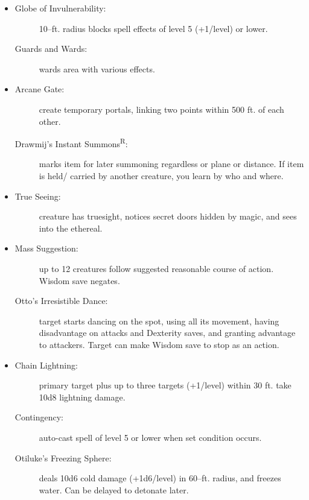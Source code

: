 \documentclass[DIV=14, paper=a4, fontsize=10pt, twocolumn, twoside]{scrartcl}
\begin{document}
\begin{itemize}[align=parleft,labelwidth=1cm]
	\renewcommand{\labelitemi}{Abjur}\item
	\begin{description}
 \item[Globe of Invulnerability:] 10–ft. radius blocks spell effects of level 5 (+1/level) or lower.
 \item[Guards and Wards:] wards area with various effects.
\end{description}
\renewcommand{\labelitemi}{Conj}\item
\begin{description}
 \item[Arcane Gate:] create temporary portals, linking two points within 500 ft. of each other.
 \item[Drawmij’s Instant Summons\textsuperscript{R}:] marks item for later summoning regardless or plane or distance. If item is held/ carried by another creature, you learn by who and where.
\end{description}
\renewcommand{\labelitemi}{Div}\item
\begin{description}
 \item[True Seeing:] creature has truesight, notices secret doors hidden by magic, and sees into the ethereal.
\end{description}
\renewcommand{\labelitemi}{Ench}\item
\begin{description}
 \item[Mass Suggestion:] up to 12 creatures follow suggested reasonable course of action. Wisdom save negates.
 \item[Otto’s Irresistible Dance:] target starts dancing on the spot, using all its movement, having disadvantage on attacks and Dexterity saves, and granting advantage to attackers. Target can make Wisdom save to stop as an action.
\end{description}
\renewcommand{\labelitemi}{Evoc}\item
\begin{description}
 \item[Chain Lightning:] primary target plus up to three targets (+1/level) within 30 ft. take 10d8 lightning damage.
 \item[Contingency:] auto-cast spell of level 5 or lower when set condition occurs.
 \item[Otiluke’s Freezing Sphere:] deals 10d6 cold damage (+1d6/level) in 60–ft. radius, and freezes water. Can be delayed to detonate later.

\end{description}
\end{itemize}
\end{document}
